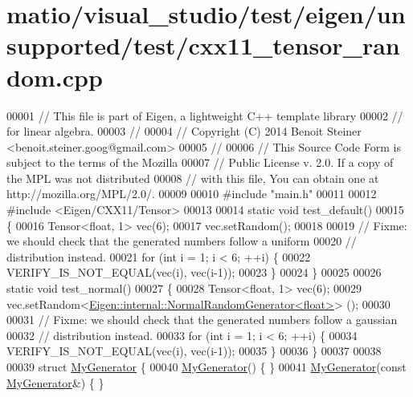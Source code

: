 \hypertarget{matio_2visual__studio_2test_2eigen_2unsupported_2test_2cxx11__tensor__random_8cpp_source}{}\section{matio/visual\+\_\+studio/test/eigen/unsupported/test/cxx11\+\_\+tensor\+\_\+random.cpp}
\label{matio_2visual__studio_2test_2eigen_2unsupported_2test_2cxx11__tensor__random_8cpp_source}

\begin{DoxyCode}
00001 \textcolor{comment}{// This file is part of Eigen, a lightweight C++ template library}
00002 \textcolor{comment}{// for linear algebra.}
00003 \textcolor{comment}{//}
00004 \textcolor{comment}{// Copyright (C) 2014 Benoit Steiner <benoit.steiner.goog@gmail.com>}
00005 \textcolor{comment}{//}
00006 \textcolor{comment}{// This Source Code Form is subject to the terms of the Mozilla}
00007 \textcolor{comment}{// Public License v. 2.0. If a copy of the MPL was not distributed}
00008 \textcolor{comment}{// with this file, You can obtain one at http://mozilla.org/MPL/2.0/.}
00009 
00010 \textcolor{preprocessor}{#include "main.h"}
00011 
00012 \textcolor{preprocessor}{#include <Eigen/CXX11/Tensor>}
00013 
00014 \textcolor{keyword}{static} \textcolor{keywordtype}{void} test\_default()
00015 \{
00016   Tensor<float, 1> vec(6);
00017   vec.setRandom();
00018 
00019   \textcolor{comment}{// Fixme: we should check that the generated numbers follow a uniform}
00020   \textcolor{comment}{// distribution instead.}
00021   \textcolor{keywordflow}{for} (\textcolor{keywordtype}{int} i = 1; i < 6; ++i) \{
00022     VERIFY\_IS\_NOT\_EQUAL(vec(i), vec(i-1));
00023   \}
00024 \}
00025 
00026 \textcolor{keyword}{static} \textcolor{keywordtype}{void} test\_normal()
00027 \{
00028   Tensor<float, 1> vec(6);
00029   vec.setRandom<\hyperlink{class_eigen_1_1internal_1_1_normal_random_generator}{Eigen::internal::NormalRandomGenerator<float>}>
      ();
00030 
00031   \textcolor{comment}{// Fixme: we should check that the generated numbers follow a gaussian}
00032   \textcolor{comment}{// distribution instead.}
00033   \textcolor{keywordflow}{for} (\textcolor{keywordtype}{int} i = 1; i < 6; ++i) \{
00034     VERIFY\_IS\_NOT\_EQUAL(vec(i), vec(i-1));
00035   \}
00036 \}
00037 
00038 
00039 \textcolor{keyword}{struct }\hyperlink{struct_my_generator}{MyGenerator} \{
00040   \hyperlink{struct_my_generator}{MyGenerator}() \{ \}
00041   \hyperlink{struct_my_generator}{MyGenerator}(\textcolor{keyword}{const} \hyperlink{struct_my_generator}{MyGenerator}&) \{ \}

\end{DoxyCode}
